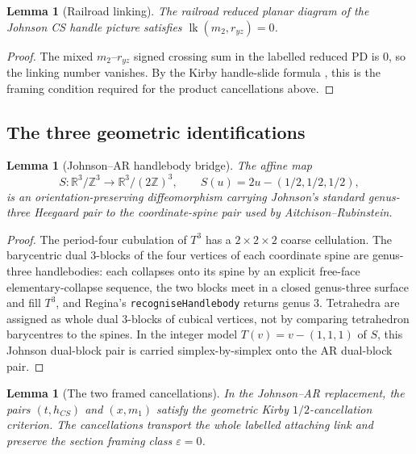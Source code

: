 \documentclass[11pt]{amsart}
\newtheorem{lemma}[theorem]{Lemma}
\theoremstyle{definition}
\theoremstyle{remark}
\begin{document}
\begin{lemma}[Railroad linking]\label{lem:P0d-link}
The railroad reduced planar diagram of the Johnson CS handle picture satisfies
$\operatorname{lk}(m_2,r_{yz})=0$.
\end{lemma}

\begin{proof}
The mixed $m_2$--$r_{yz}$ signed crossing sum in the labelled reduced PD is
$0$, so the linking number vanishes.  By the Kirby handle-slide formula
\cite{Kirby1978}, this is the framing condition required for the product
cancellations above.
\end{proof}

\subsection{The three geometric identifications}

\begin{lemma}[Johnson--AR handlebody bridge]\label{lem:P0a}
The affine map
\[
S:\mathbb R^3/\mathbb Z^3\longrightarrow
\mathbb R^3/(2\mathbb Z)^3,\qquad
S(u)=2u-(1/2,1/2,1/2),
\]
is an orientation-preserving diffeomorphism carrying Johnson's standard
genus-three Heegaard pair to the coordinate-spine pair used by
Aitchison--Rubinstein.
\end{lemma}

\begin{proof}
The period-four cubulation of $T^3$ has a $2\times 2\times 2$ coarse
cellulation.  The barycentric dual $3$-blocks of the four vertices of each
coordinate spine are genus-three handlebodies: each collapses onto its spine
by an explicit free-face elementary-collapse sequence, the two blocks meet
in a closed genus-three surface and fill $T^3$, and Regina's
\texttt{recogniseHandlebody} returns genus $3$.  Tetrahedra are assigned as
whole dual $3$-blocks of cubical vertices, not by comparing tetrahedron
barycentres to the spines.  In the integer model $T(v)=v-(1,1,1)$ of $S$,
this Johnson dual-block pair is carried simplex-by-simplex onto the AR
dual-block pair.
\end{proof}

\begin{lemma}[The two framed cancellations]\label{lem:P0b}
In the Johnson--AR replacement, the pairs \((t,h_{CS})\) and \((x,m_1)\)
satisfy the geometric Kirby \(1/2\)-cancellation criterion.  The
cancellations transport the whole labelled attaching link and preserve the
section framing class \(\varepsilon=0\).
\end{lemma}
\end{document}
